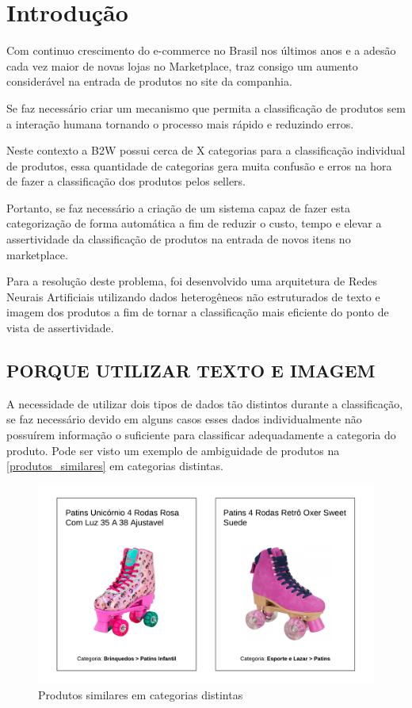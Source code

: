 \chapter[Introdução]{Introdução}

Com continuo crescimento do e-commerce no Brasil nos últimos anos e a adesão cada vez maior de novas lojas no Marketplace, traz consigo um aumento considerável na entrada de produtos no site da companhia.

Se faz necessário criar um mecanismo que permita a classificação de produtos sem a interação humana tornando o processo mais rápido e reduzindo erros.

Neste contexto a B2W possui cerca de X categorias para a classificação individual de produtos, essa quantidade de categorias gera muita confusão e erros na hora de fazer a classificação dos produtos pelos sellers.

Portanto, se faz necessário a criação de um sistema capaz de fazer esta categorização de forma automática a fim de reduzir o custo, tempo e elevar a assertividade da classificação de produtos na entrada de novos itens no marketplace. 

Para a resolução deste problema, foi desenvolvido uma arquitetura de Redes Neurais Artificiais utilizando dados heterogêneos não estruturados de texto e imagem dos produtos a fim de tornar a classificação mais eficiente do ponto de vista de assertividade.

\section{PORQUE UTILIZAR TEXTO E IMAGEM}

A necessidade de utilizar dois tipos de dados tão distintos durante a classificação, se faz necessário devido em alguns casos esses dados individualmente não possuírem informação o suficiente para classificar adequadamente a categoria do produto. Pode ser visto um exemplo de ambiguidade de produtos na \autoref{produtos_similares} em categorias distintas.

\begin{figure}[htb]
	\caption{\label{produtos_similares} Produtos similares em categorias distintas}
	\begin{center}
	    \includegraphics[scale=0.5]{artigo/recursos/imagens/produtos-similares.png}
	\end{center}
\end{figure}

